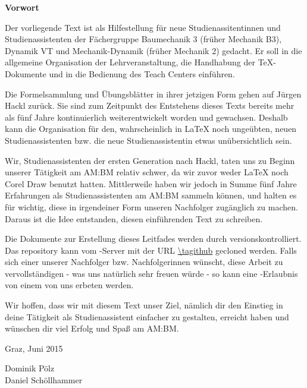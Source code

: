 {\huge \textbf{Vorwort}}
\vspace{8mm}

Der vorliegende Text ist als Hilfestellung für neue Studienassitentinnen und
Studienassistenten der Fächergruppe Baumechanik 3 (früher Mechanik B3), Dynamik
VT und Mechanik-Dynamik (früher Mechanik 2) gedacht. Er soll in die allgemeine
Organisation der Lehrveranstaltung, die Handhabung der \TeX{}-Dokumente und in
die Bedienung des Teach Centers einführen.

Die Formelsammlung und Übungsblätter in ihrer jetzigen Form gehen auf
Jürgen Hackl %
zurück. Sie sind zum Zeitpunkt des Entstehens
dieses Texts bereits mehr als fünf Jahre kontinuierlich weiterentwickelt worden
und gewachsen. Deshalb kann die Organisation für den, wahrscheinlich in \LaTeX{}
noch ungeübten, neuen Studienassistenten bzw. die neue Studienassistentin etwas
unübersichtlich sein.

Wir, Studienassistenten der ersten \glqq{}Generation\grqq{} nach Hackl, taten
uns zu Beginn unserer Tätigkeit am AM:BM relativ schwer, da wir zuvor weder
\LaTeX{} noch Corel Draw benutzt hatten. Mittlerweile haben wir jedoch
in Summe fünf Jahre Erfahrungen als Studienassistenten am AM:BM sammeln können,
und halten es für wichtig, diese in irgendeiner Form unseren Nachfolger 
zugänglich zu machen. Daraus ist die Idee entstanden, diesen einführenden Text
zu schreiben.

Die Dokumente zur Erstellung dieses Leitfades werden durch  
versionskontrolliert. Das repository kann vom -Server mit der
URL \url{\tagithub} gecloned werden. Falls sich einer unserer Nachfolger bzw.
Nachfolgerinnen wünscht, diese Arbeit zu vervollständigen - was uns natürlich 
sehr freuen würde - so kann eine -Erlaubnis von einem von uns
erbeten werden.

Wir hoffen, dass wir mit diesem Text unser Ziel, nämlich dir den Einstieg in
deine Tätigkeit als Studienassistent einfacher zu gestalten, erreicht haben und
wünschen dir viel Erfolg und Spaß am AM:BM.

\begin{flushleft}
Graz, Juni 2015 
\end{flushleft}
\begin{flushright}
Dominik Pölz\\Daniel Schöllhammer
\end{flushright}

